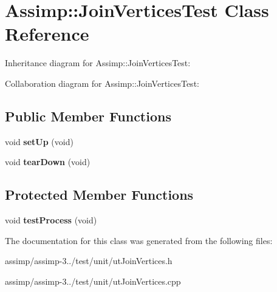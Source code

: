 \hypertarget{class_assimp_1_1_join_vertices_test}{\section{Assimp\+:\+:Join\+Vertices\+Test Class Reference}
\label{class_assimp_1_1_join_vertices_test}
}


Inheritance diagram for Assimp\+:\+:Join\+Vertices\+Test\+:


Collaboration diagram for Assimp\+:\+:Join\+Vertices\+Test\+:
\subsection*{Public Member Functions}
\begin{DoxyCompactItemize}
\item 
\hypertarget{class_assimp_1_1_join_vertices_test_acd0d4b5bbefae64d8c05bfea6fdb7864}{void {\bfseries set\+Up} (void)}\label{class_assimp_1_1_join_vertices_test_acd0d4b5bbefae64d8c05bfea6fdb7864}

\item 
\hypertarget{class_assimp_1_1_join_vertices_test_af5ad8a4ac2fed4017bf15b5f8e93c4e1}{void {\bfseries tear\+Down} (void)}\label{class_assimp_1_1_join_vertices_test_af5ad8a4ac2fed4017bf15b5f8e93c4e1}

\end{DoxyCompactItemize}
\subsection*{Protected Member Functions}
\begin{DoxyCompactItemize}
\item 
\hypertarget{class_assimp_1_1_join_vertices_test_a395ffa8abafe40622cd6c93c06b6e3fb}{void {\bfseries test\+Process} (void)}\label{class_assimp_1_1_join_vertices_test_a395ffa8abafe40622cd6c93c06b6e3fb}

\end{DoxyCompactItemize}


The documentation for this class was generated from the following files\+:\begin{DoxyCompactItemize}
\item 
assimp/assimp-\/3../test/unit/ut\+Join\+Vertices.\+h\item 
assimp/assimp-\/3../test/unit/ut\+Join\+Vertices.\+cpp\end{DoxyCompactItemize}
